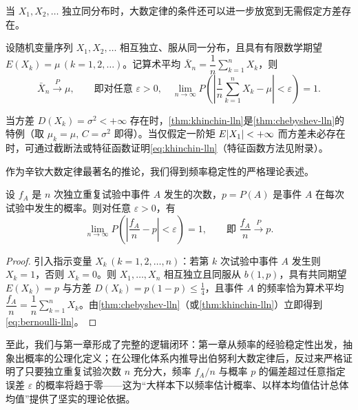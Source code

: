当 $X_1,X_2,\ldots$ 独立同分布时，大数定律的条件还可以进一步放宽到无需假定方差存在。

\begin{theorem}
\label{thm:khinchin-lln}
设随机变量序列 $X_1,X_2,\ldots$ 相互独立、服从同一分布，且具有有限数学期望 $E(X_k)=\mu\,(k=1,2,\ldots)$。记算术平均 $\bar{X}_n=\dfrac{1}{n}\sum_{k=1}^{n}X_k$，则
\begin{equation}
  \bar{X}_n\xrightarrow{P}\mu,
  \qquad\text{即对任意 }\varepsilon>0,\quad
  \lim_{n\to\infty}P\!\left(\left|\frac{1}{n}\sum_{k=1}^{n}X_k-\mu\right|<\varepsilon\right)=1.
  \label{eq:khinchin-lln}
\end{equation}
\end{theorem}

当方差 $D(X_k)=\sigma^2<+\infty$ 存在时，\cref{thm:khinchin-lln}是\cref{thm:chebyshev-lln}的特例（取 $\mu_k=\mu,\,C=\sigma^2$ 即得）。当仅假定一阶矩 $E\lvert X_1\rvert<+\infty$ 而方差未必存在时，可通过截断法或特征函数证明\eqref{eq:khinchin-lln}（特征函数方法见附录）。

作为辛钦大数定律最著名的推论，我们得到频率稳定性的严格理论表述。

\begin{theorem}
\label{thm:bernoulli-lln}
设 $f_A$ 是 $n$ 次独立重复试验中事件 $A$ 发生的次数，$p=P(A)$ 是事件 $A$ 在每次试验中发生的概率。则对任意 $\varepsilon>0$，有
\begin{equation}
  \lim_{n\to\infty}P\!\left(\left|\frac{f_A}{n}-p\right|<\varepsilon\right)=1,
  \qquad\text{即 }\frac{f_A}{n}\xrightarrow{P} p.
  \label{eq:bernoulli-lln}
\end{equation}
\end{theorem}
\begin{proof}
引入指示变量 $X_k\,(k=1,2,\ldots,n)$：若第 $k$ 次试验中事件 $A$ 发生则 $X_k=1$，否则 $X_k=0$。则 $X_1,\ldots,X_n$ 相互独立且同服从 $b(1,p)$，具有共同期望 $E(X_k)=p$ 与方差 $D(X_k)=p(1-p)\le\frac{1}{4}$，且事件 $A$ 的频率恰为算术平均 $\dfrac{f_A}{n}=\dfrac{1}{n}\sum_{k=1}^{n}X_k$。由\cref{thm:chebyshev-lln}（或\cref{thm:khinchin-lln}）立即得到\eqref{eq:bernoulli-lln}。
\end{proof}

至此，我们与第一章形成了完整的逻辑闭环：第一章从频率的经验稳定性出发，抽象出概率的公理化定义；在公理化体系内推导出伯努利大数定律后，反过来严格证明了只要独立重复试验次数 $n$ 充分大，频率 $f_A/n$ 与概率 $p$ 的偏差超过任意指定误差 $\varepsilon$ 的概率将趋于零——这为“大样本下以频率估计概率、以样本均值估计总体均值”提供了坚实的理论依据。

